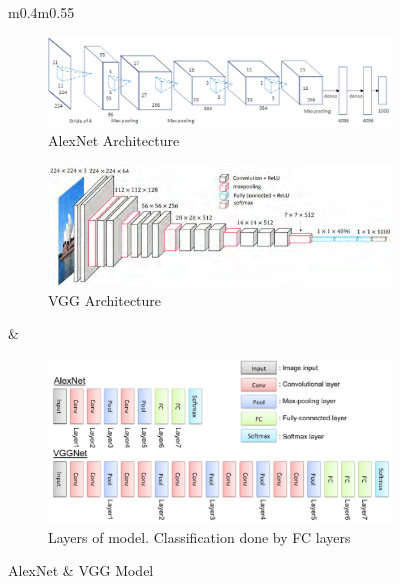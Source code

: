 \begin{figure}[!ht]
	\centering
	\begin{tabular}[!ht]{m{0.4\hsize}m{0.55\hsize}}
		\begin{subfigure}[b]{\linewidth}
			\centering
			\includegraphics[width=0.9\linewidth]{Images/AlexNet_3D}
			\caption{AlexNet Architecture}
		\end{subfigure}
		
		\begin{subfigure}[b]{\linewidth}
			\centering
			\includegraphics[width=0.9\linewidth]{Images/VGG_3D}
			\caption{VGG Architecture}
		\end{subfigure}
	
		& 
		\begin{subfigure}[b]{\linewidth}
			\centering
			\includegraphics[width=\linewidth]{Images/AlexNet-and-VGGNet-architecture}
			\caption{Layers of model. Classification done by FC layers}
		\end{subfigure}
	\end{tabular}
	\caption{AlexNet \& VGG Model}	
	\label{fig:alexnet_vgg}
\end{figure}

